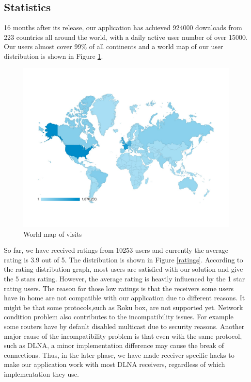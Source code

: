 \subsection{Statistics\label{4_2}}
16 months after its release, our application has achieved 924000 downloads from
223 countries all around the world, with a daily active user number of over
15000. Our users almost cover 99\% of all continents and a world map of our user
distribution is shown in Figure \ref{user_map}.
\begin{figure}[hb]
\centering \includegraphics[width=0.9\columnwidth]{charts/session_world_map}
\caption{World map of visits \label{user_map}}
\end{figure}
So far, we have received ratings from 10253 users and currently the average
rating is 3.9 out of 5. The distribution is shown in Figure \ref{ratings}.
According to the rating distribution graph, most users are satisfied with our
solution and give the 5 stars rating. However, the average rating is heavily
influenced by the 1 star rating users. The reason for those low ratings is that
the receivers some users have in home are not compatible with our application
due to different reasons. It might be that some protocols,such as Roku box, are
not supported yet. Network condition problem also contributes to the
incompatibility issues. For example some routers have by default disabled
multicast due to security reasons. Another major cause of the incompatibility
problem is that even with the same protocol, such as DLNA, a minor
implementation difference may cause the break of connections. Thus, in the
later phase, we have made receiver specific hacks to make our application work
with most DLNA receivers, regardless of which implementation they use.
